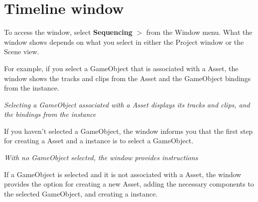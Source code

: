 \chapter{Timeline window}
\hypertarget{md__hey_tea_9_2_library_2_package_cache_2com_8unity_8timeline_0d1_87_85_2_documentation_0i_2tl__window}{}\label{md__hey_tea_9_2_library_2_package_cache_2com_8unity_8timeline_0d1_87_85_2_documentation_0i_2tl__window}
\label{md__hey_tea_9_2_library_2_package_cache_2com_8unity_8timeline_0d1_87_85_2_documentation_0i_2tl__window_autotoc_md4755}%
%
 To access the  window, select {\bfseries{Sequencing}} \texorpdfstring{$>$}{>} {\bfseries{}} from the Window menu. What the  window shows depends on what you select in either the Project window or the Scene view.

For example, if you select a Game\+Object that is associated with a  Asset, the  window shows the tracks and clips from the  Asset and the Game\+Object bindings from the  instance.



{\itshape Selecting a Game\+Object associated with a  Asset displays its tracks and clips, and the bindings from the  instance}

If you haven’t selected a Game\+Object, the  window informs you that the first step for creating a  Asset and a  instance is to select a Game\+Object.



{\itshape With no Game\+Object selected, the  window provides instructions}

If a Game\+Object is selected and it is not associated with a  Asset, the  window provides the option for creating a new  Asset, adding the necessary components to the selected Game\+Object, and creating a  instance.



